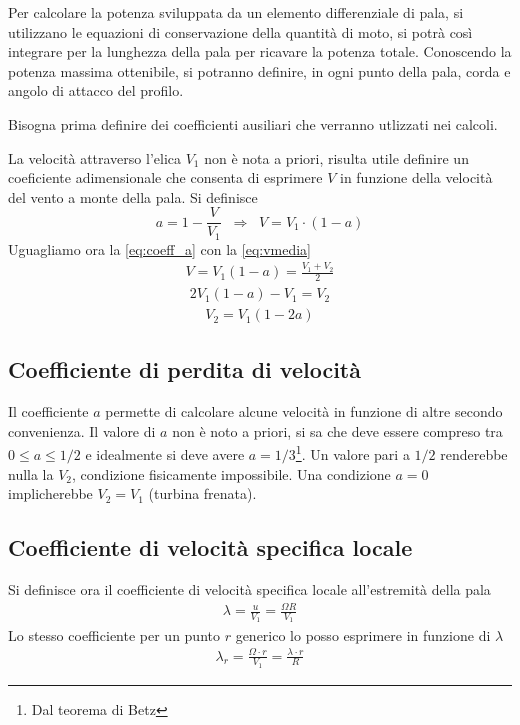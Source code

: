 Per calcolare la potenza sviluppata da un elemento differenziale di pala, si utilizzano le equazioni di conservazione della quantità di moto, si potrà così integrare per la lunghezza della pala per ricavare la potenza totale. Conoscendo la potenza massima ottenibile, si potranno definire, in ogni punto della pala, corda e angolo di attacco del profilo. 

Bisogna prima definire dei coefficienti ausiliari che verranno utlizzati nei calcoli. 

La velocità attraverso l'elica $V_1$ non è nota a priori, risulta utile definire un coeficiente adimensionale che consenta di esprimere $V$ in funzione della velocità del vento a monte della pala. Si definisce 
\begin{equation}\label{eq:coeff_a}
a = 1-\frac{V}{V_1} \;\; \Rightarrow \;\; V = V_1 \cdot \left(1-a \right)
\end{equation}
Uguagliamo ora la \ref{eq:coeff_a} con la \ref{eq:vmedia}
\begin{align*}
V = V_1 (1-a) = \frac{V_1 +V_2}{2}
\end{align*}
\begin{align*}
2 V_1 (1-a) - V_1 = V_2
\end{align*}
\begin{align*}
V_2 = V_1 (1-2a)
\end{align*}
\subsection{Coefficiente di perdita di velocità}
Il coefficiente $a$ permette di calcolare alcune velocità in funzione di altre secondo convenienza. Il valore di $a$ non è noto a priori, si sa che deve essere compreso tra $0 \leq a \leq 1/2$ e idealmente si deve avere $a = 1/3$\footnote{Dal teorema di Betz}. Un valore pari a $1/2$ renderebbe nulla la $V_2$, condizione fisicamente impossibile. Una condizione $a=0$ implicherebbe $V_2 = V_1$ (turbina frenata). 
\subsection{Coefficiente di velocità specifica locale}
Si definisce ora il coefficiente di velocità specifica locale all'estremità della pala 
\begin{align*}
\lambda = \frac{u}{V_1} = \frac{\Omega R}{V_1} 
\end{align*}
Lo stesso coefficiente per un punto $r$ generico lo posso esprimere in funzione di $\lambda$
\begin{align*}
\lambda_r = \frac{\Omega \cdot r}{V_1} = \frac{\lambda \cdot r}{R} 
\end{align*}
